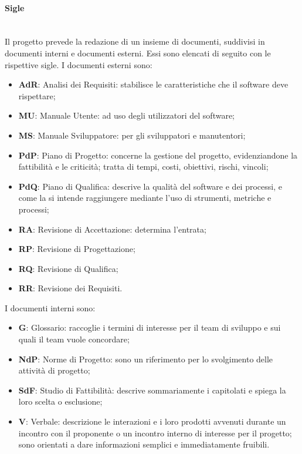 		\paragraph{Sigle} \mbox{}\\
		Il progetto prevede la redazione di un insieme di documenti, suddivisi in documenti interni e documenti esterni. Essi sono elencati di seguito con le rispettive sigle.\newline
		I documenti esterni sono:		
		\begin{itemize}
			\item \textbf{AdR}: Analisi dei Requisiti: stabilisce le caratteristiche che il software deve rispettare;
			\item \textbf{MU}: Manuale Utente: ad uso degli utilizzatori del software;
			\item \textbf{MS}: Manuale Sviluppatore: per gli sviluppatori e manutentori;
			\item \textbf{PdP}: Piano di Progetto: concerne la gestione del progetto, evidenziandone la fattibilità e le criticità; tratta di tempi, costi, obiettivi, rischi, vincoli;
			\item \textbf{PdQ}: Piano di Qualifica: descrive la qualità del software e dei processi, e come la si intende raggiungere mediante l'uso di strumenti, metriche e processi;
			\item \textbf{RA}: Revisione di Accettazione: determina l'entrata;
			\item \textbf{RP}: Revisione di Progettazione;
			\item \textbf{RQ}: Revisione di Qualifica;
			\item \textbf{RR}: Revisione dei Requisiti.
		\end{itemize}	
		I documenti interni sono:
		\begin{itemize}
			\item \textbf{G}: Glossario: raccoglie i termini di interesse per il team di sviluppo e sui quali il team vuole concordare;
			\item \textbf{NdP}: Norme di Progetto: sono un riferimento per lo svolgimento delle attività di progetto;
			\item \textbf{SdF}: Studio di Fattibilità: descrive sommariamente i capitolati e spiega la loro scelta o esclusione;
			\item \textbf{V}: Verbale: descrizione le interazioni e i loro prodotti avvenuti durante un incontro con il proponente o un incontro interno di interesse per il progetto; sono orientati a dare informazioni semplici e immediatamente fruibili. 
		\end{itemize}
